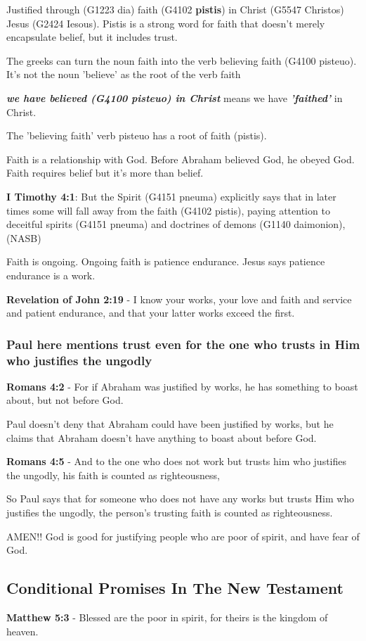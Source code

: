 \documentclass[11pt]{article}
\begin{document}
Justified through (G1223 dia) faith (G4102 \textbf{pistis}) in Christ (G5547 Christos) Jesus (G2424 Iesous).
Pistis is a strong word for faith that doesn't merely encapsulate belief, but it includes trust.

The greeks can turn the noun faith into the verb believing faith (G4100 pisteuo).
It's not the noun 'believe' as the root of the verb faith

\emph{\textbf{we have believed (G4100 pisteuo) in Christ}} means we have \emph{\textbf{'faithed'}} in Christ.

The 'believing faith' verb pisteuo has a root of faith (pistis).

Faith is a relationship with God.
Before Abraham believed God, he obeyed God.
Faith requires belief but it's more than belief.

\textbf{I Timothy 4:1}: But the Spirit (G4151 pneuma) explicitly says that in later times some will fall away from the faith (G4102 pistis), paying attention to deceitful spirits (G4151 pneuma) and doctrines of demons (G1140 daimonion), (NASB)

Faith is ongoing. Ongoing faith is patience endurance. Jesus says patience endurance is a work.

\textbf{Revelation of John 2:19} - I know your works, your love and faith and service and patient endurance, and that your latter works exceed the first.

\subsubsection{Paul here mentions trust even for the one who trusts in Him who justifies the ungodly}
\label{sec:orgabdc79d}
\textbf{Romans 4:2} - For if Abraham was justified by works, he has something to boast about, but not before God.

Paul doesn't deny that Abraham could have been
justified by works, but he claims that Abraham
doesn't have anything to boast about before
God.

\textbf{Romans 4:5} - And to the one who does not work but trusts him who justifies the ungodly, his faith is counted as righteousness,

So Paul says that for someone who does not
have any works but trusts Him who justifies
the ungodly, the person's trusting faith is
counted as righteousness.

AMEN!! God is good for justifying people who are poor of spirit, and have fear of God.

\subsection{Conditional Promises In The New Testament}
\label{sec:org6b565f6}
\textbf{Matthew 5:3} - Blessed are the poor in spirit, for theirs is the kingdom of heaven.
\end{document}
